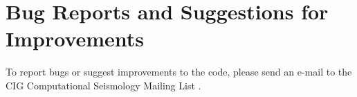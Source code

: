 \chapter*{Bug Reports and Suggestions for Improvements}\label{cha:Bug-Reports-and}

To report bugs or suggest improvements to the code, please send an
e-mail to the CIG Computational Seismology Mailing List .

